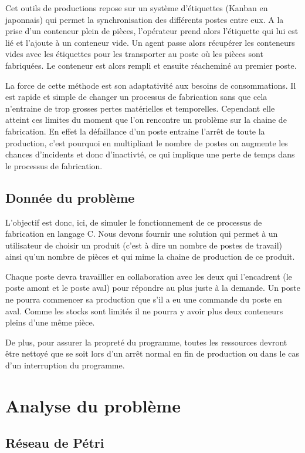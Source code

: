 \documentclass[11pt]{report}
\begin{document}
	Cet outils de productions repose sur un système d'étiquettes (Kanban en japonnais) qui permet la synchronisation des différents postes entre eux. A la prise d'un conteneur plein de pièces, l'opérateur prend alors l'étiquette qui lui est lié et l'ajoute à un conteneur vide. Un agent passe alors récupérer les conteneurs vides avec les étiquettes pour les transporter au poste où les pièces sont fabriquées. Le conteneur est alors rempli et ensuite réacheminé au premier poste.
	
	La force de cette méthode est son adaptativité aux besoins de consommations. Il est rapide et simple de changer un processus de fabrication sans que cela n'entraine de trop grosses pertes matérielles et temporelles. Cependant elle atteint ces limites du moment que l'on rencontre un problème sur la chaine de fabrication. En effet la défaillance d'un poste entraine l'arrêt de toute la production, c'est pourquoi en multipliant le nombre de postes on augmente les chances d'incidents et donc d'inactivté, ce qui implique une perte de temps dans le processus de fabrication.
	
	\section{Donnée du problème}
	
	L'objectif est donc, ici, de simuler le fonctionnement de ce processus de fabrication en langage C. Nous devons fournir une solution qui permet à un utilisateur de choisir un produit (c'est à dire un nombre de postes de travail) ainsi qu'un nombre de pièces et qui mime la chaine de production de ce produit. 
	
	Chaque poste devra travailller en collaboration avec les deux qui l'encadrent (le poste amont et le poste aval) pour répondre au plus juste à la demande. Un poste ne pourra commencer sa production que s'il a eu une commande du poste en aval. Comme les stocks sont limités il ne pourra y avoir plus deux conteneurs pleins d'une même pièce. 
	
	De plus, pour assurer la propreté du programme, toutes les ressources devront être nettoyé que se soit lors d'un arrêt normal en fin de production ou dans le cas d'un interruption du programme.
\chapter{Analyse du problème}
	
	\section{Réseau de Pétri}
	
\end{document}
